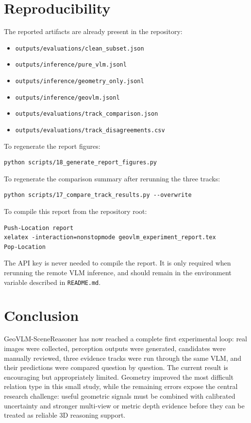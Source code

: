 \documentclass[11pt]{article}
\begin{document}
\section{Reproducibility}
The reported artifacts are already present in the repository:

\begin{itemize}[leftmargin=18pt,itemsep=1pt]
    \item \texttt{outputs/evaluations/clean\_subset.json}
    \item \texttt{outputs/inference/pure\_vlm.jsonl}
    \item \texttt{outputs/inference/geometry\_only.jsonl}
    \item \texttt{outputs/inference/geovlm.jsonl}
    \item \texttt{outputs/evaluations/track\_comparison.json}
    \item \texttt{outputs/evaluations/track\_disagreements.csv}
\end{itemize}

To regenerate the report figures:

\begin{verbatim}
python scripts/18_generate_report_figures.py
\end{verbatim}

To regenerate the comparison summary after rerunning the three tracks:

\begin{verbatim}
python scripts/17_compare_track_results.py --overwrite
\end{verbatim}

To compile this report from the repository root:

\begin{verbatim}
Push-Location report
xelatex -interaction=nonstopmode geovlm_experiment_report.tex
Pop-Location
\end{verbatim}

The API key is never needed to compile the report. It is only required when rerunning the remote VLM inference, and should remain in the environment variable described in \texttt{README.md}.

\section{Conclusion}
GeoVLM-SceneReasoner has now reached a complete first experimental loop: real images were collected, perception outputs were generated, candidates were manually reviewed, three evidence tracks were run through the same VLM, and their predictions were compared question by question. The current result is encouraging but appropriately limited. Geometry improved the most difficult relation type in this small study, while the remaining errors expose the central research challenge: useful geometric signals must be combined with calibrated uncertainty and stronger multi-view or metric depth evidence before they can be treated as reliable 3D reasoning support.
\end{document}
